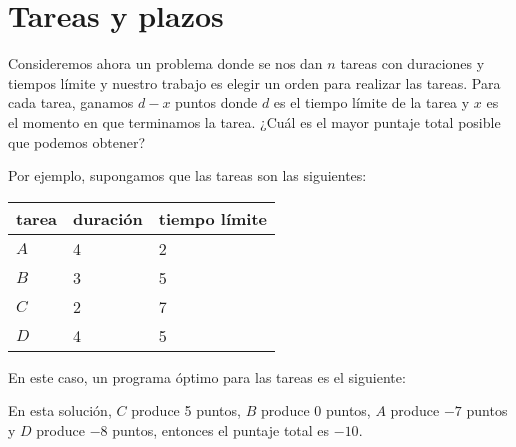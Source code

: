 \section{Tareas y plazos}

Consideremos ahora un problema donde
se nos dan $n$ tareas con duraciones y tiempos límite
y nuestro trabajo es elegir un orden para realizar las tareas.
Para cada tarea, ganamos $d-x$ puntos
donde $d$ es el tiempo límite de la tarea
y $x$ es el momento en que terminamos la tarea.
¿Cuál es el mayor puntaje total posible
que podemos obtener?

Por ejemplo, supongamos que las tareas son las siguientes:
\begin{center}
    \begin{tabular}{lll}
        tarea & duración & tiempo límite \\
        \hline
        $A$   & 4        & 2             \\
        $B$   & 3        & 5             \\
        $C$   & 2        & 7             \\
        $D$   & 4        & 5             \\
    \end{tabular}
\end{center}
En este caso, un programa óptimo para las tareas
es el siguiente:
\begin{center}
\end{center}
En esta solución, $C$ produce 5 puntos,
$B$ produce 0 puntos, $A$ produce $-7$ puntos
y $D$ produce $-8$ puntos,
entonces el puntaje total es $-10$.

